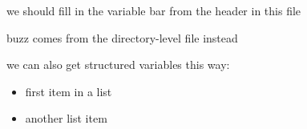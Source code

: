 
we should fill in the variable bar from the header in this file

buzz comes from the directory-level file instead

we can also get structured variables this way:

\begin{itemize}
    \item first item in a list
    \item another list item
\end{itemize}